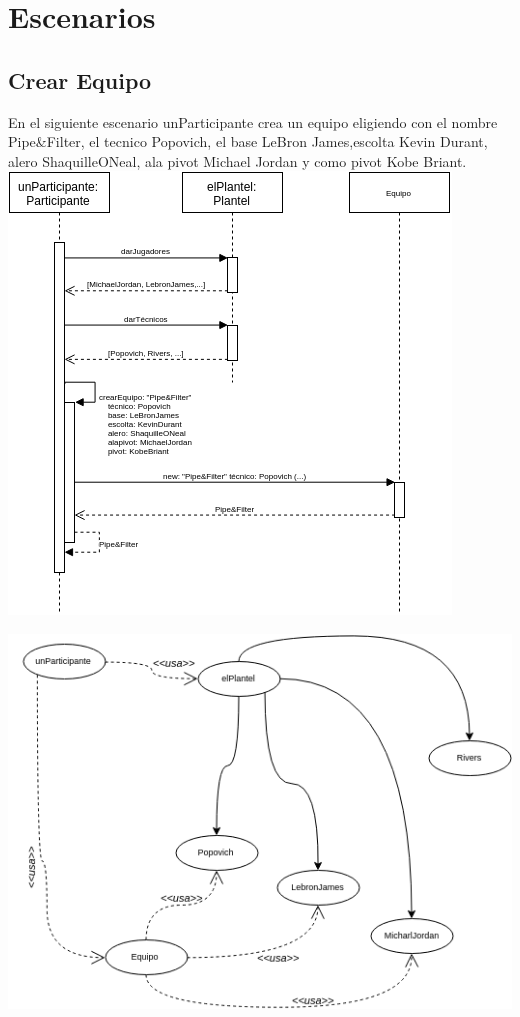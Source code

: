 \section{Escenarios}

\subsection{Crear Equipo}

En el siguiente escenario unParticipante crea un equipo eligiendo con el nombre Pipe&Filter, el tecnico Popovich, el base LeBron James,escolta Kevin Durant, alero ShaquilleONeal, ala pivot Michael Jordan y como pivot Kobe Briant. 
\includegraphics[width=\textwidth]{imgs/crearEquipoSecuencia.png}

\includegraphics[width=\textwidth]{imgs/crearEquipoObjetos.png}



